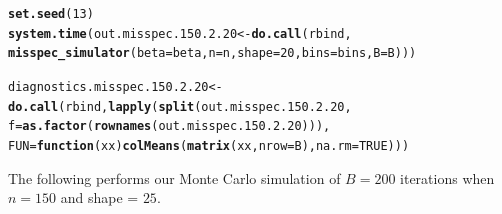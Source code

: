 \documentclass[11pt]{article}\usepackage[]{graphicx}\usepackage[]{color}
\makeatletter
\newcommand{\hlnum}[1]{\textcolor[rgb]{0.686,0.059,0.569}{#1}}%
\newcommand{\hlstd}[1]{\textcolor[rgb]{0.345,0.345,0.345}{#1}}%
\newcommand{\hlkwa}[1]{\textcolor[rgb]{0.161,0.373,0.58}{\textbf{#1}}}%
\newcommand{\hlkwb}[1]{\textcolor[rgb]{0.69,0.353,0.396}{#1}}%
\newcommand{\hlkwc}[1]{\textcolor[rgb]{0.333,0.667,0.333}{#1}}%
\newcommand{\hlkwd}[1]{\textcolor[rgb]{0.737,0.353,0.396}{\textbf{#1}}}%
\newenvironment{kframe}{%
 \def\at@end@of@kframe{}%
 \ifinner\ifhmode%
  \def\at@end@of@kframe{\end{minipage}}%
  \begin{minipage}{\columnwidth}%
 \fi\fi%
 \def\FrameCommand##1{\hskip\@totalleftmargin \hskip-\fboxsep
 \colorbox{shadecolor}{##1}\hskip-\fboxsep
     \hskip-\linewidth \hskip-\@totalleftmargin \hskip\columnwidth}%
 \MakeFramed {\advance\hsize-\width
   \@totalleftmargin\z@ \linewidth\hsize
   \@setminipage}}%
 {\par\unskip\endMakeFramed%
 \at@end@of@kframe}
\newenvironment{knitrout}{}{} %
\makeatother
\begin{document}
\begin{knitrout}
\color{fgcolor}\begin{kframe}
\begin{alltt}
\hlkwd{set.seed}\hlstd{(}\hlnum{13}\hlstd{)}
\hlkwd{system.time}\hlstd{(out.misspec.150.2.20} \hlkwb{<-} \hlkwd{do.call}\hlstd{(rbind,}
  \hlkwd{misspec_simulator}\hlstd{(}\hlkwc{beta} \hlstd{= beta,} \hlkwc{n} \hlstd{= n,} \hlkwc{shape} \hlstd{=} \hlnum{20}\hlstd{,} \hlkwc{bins} \hlstd{= bins,} \hlkwc{B} \hlstd{= B)))}
\end{alltt}


{\ttfamily\noindent\bfseries\color{errorcolor}{\#\# Error in chol.default(crossprod(x) + lambda[j] * diag(v)): the leading minor of order 5 is not positive definite}}

{\ttfamily\noindent\itshape\color{messagecolor}{\#\# Timing stopped at: 0.665 0 0.665}}\begin{alltt}
\hlstd{diagnostics.misspec.150.2.20} \hlkwb{<-} \hlkwd{do.call}\hlstd{(rbind,} \hlkwd{lapply}\hlstd{(}\hlkwd{split}\hlstd{(out.misspec.150.2.20,}
  \hlkwc{f} \hlstd{=} \hlkwd{as.factor}\hlstd{(}\hlkwd{rownames}\hlstd{(out.misspec.150.2.20))),}
  \hlkwc{FUN} \hlstd{=} \hlkwa{function}\hlstd{(}\hlkwc{xx}\hlstd{)} \hlkwd{colMeans}\hlstd{(}\hlkwd{matrix}\hlstd{(xx,} \hlkwc{nrow} \hlstd{= B),} \hlkwc{na.rm} \hlstd{=} \hlnum{TRUE}\hlstd{)))}
\end{alltt}


{\ttfamily\noindent\bfseries\color{errorcolor}{\#\# Error in split(out.misspec.150.2.20, f = as.factor(rownames(out.misspec.150.2.20))): object 'out.misspec.150.2.20' not found}}\end{kframe}
\end{knitrout}


The following performs our Monte Carlo simulation of $B = 200$ iterations 
when $n = 150$ and shape = $25$.
\end{document}
